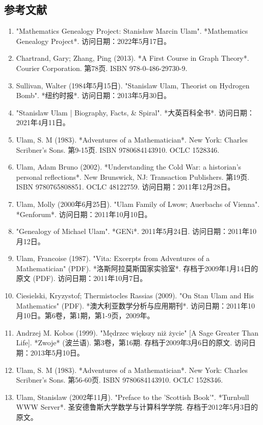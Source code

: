 \subsection{参考文献}
\begin{enumerate}
\item "Mathematics Genealogy Project: Stanisław Marcin Ulam". *Mathematics Genealogy Project*. 访问日期：2022年5月17日。
\item Chartrand, Gary; Zhang, Ping (2013). *A First Course in Graph Theory*. Courier Corporation. 第78页. ISBN 978-0-486-29730-9.
\item Sullivan, Walter (1984年5月15日). "Stanislaw Ulam, Theorist on Hydrogen Bomb". *纽约时报*. 访问日期：2013年5月30日。
\item "Stanislaw Ulam | Biography, Facts, & Spiral". *大英百科全书*. 访问日期：2021年4月11日。
\item Ulam, S. M (1983). *Adventures of a Mathematician*. New York: Charles Scribner's Sons. 第9-15页. ISBN 9780684143910. OCLC 1528346.
\item Ulam, Adam Bruno (2002). *Understanding the Cold War: a historian's personal reflections*. New Brunswick, NJ: Transaction Publishers. 第19页. ISBN 9780765808851. OCLC 48122759. 访问日期：2011年12月28日。
\item Ulam, Molly (2000年6月25日). "Ulam Family of Lwow; Auerbachs of Vienna". *Genforum*. 访问日期：2011年10月10日。
\item "Genealogy of Michael Ulam". *GENi*. 2011年5月24日. 访问日期：2011年10月12日。
\item Ulam, Francoise (1987). "Vita: Excerpts from Adventures of a Mathematician" (PDF). *洛斯阿拉莫斯国家实验室*. 存档于2009年1月14日的原文 (PDF). 访问日期：2011年10月7日。
\item Ciesielski, Kryzystof; Thermistocles Rassias (2009). "On Stan Ulam and His Mathematics" (PDF). *澳大利亚数学分析与应用期刊*. 访问日期：2011年10月10日。第6卷，第1期，第1-9页，2009年。
\item Andrzej M. Kobos (1999). "Mędrzec większy niż życie" [A Sage Greater Than Life]. *Zwoje* (波兰语). 第3卷，第16期. 存档于2009年3月6日的原文. 访问日期：2013年5月10日。
\item Ulam, S. M (1983). *Adventures of a Mathematician*. New York: Charles Scribner's Sons. 第56-60页. ISBN 9780684143910. OCLC 1528346.
\item Ulam, Stanislaw (2002年11月). "Preface to the 'Scottish Book'". *Turnbull WWW Server*. 圣安德鲁斯大学数学与计算科学学院. 存档于2012年5月3日的原文。

\end{enumerate}
